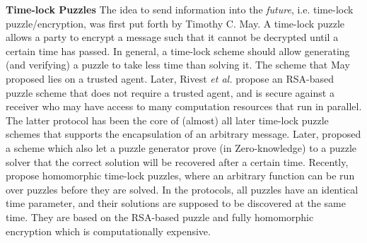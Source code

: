 
\noindent\textbf{Time-lock Puzzles}
The idea to send information into the \emph{future}, i.e.
time-lock puzzle/encryption, was first put forth by Timothy C. May. A time-lock puzzle allows a party to encrypt a message such that it cannot be decrypted  until a certain  time has passed. In general,  a  time-lock scheme should allow   generating (and verifying) a puzzle to take less time than solving it. The  scheme that May proposed lies on a trusted agent. Later, Rivest \textit{et al.} \cite{Rivest:1996:TPT:888615} propose an RSA-based puzzle scheme that does not require a trusted agent, and is secure against a receiver
who may have access to many  computation resources that run in parallel. The latter protocol has been the core of (almost) all later time-lock puzzle schemes that supports the encapsulation of an arbitrary message. Later, \cite{BonehN00,DBLP:conf/fc/GarayJ02} proposed a scheme which also let a puzzle generator  prove (in Zero-knowledge)  to a puzzle solver that the correct solution  will be recovered after a certain time.    Recently, \cite{MalavoltaT19,BrakerskiDGM19}  propose  homomorphic time-lock puzzles, where an arbitrary function can be run over puzzles before they are solved. In the protocols, all puzzles have an identical time parameter, and their solutions are supposed to be discovered at the same time. They  are based on the RSA-based puzzle  and   fully homomorphic encryption which is computationally expensive.




